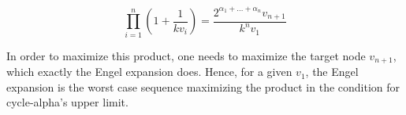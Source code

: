 \[
\prod_{i=1}^{n}\left(1+\frac{1}{kv_i}\right)=\frac{2^{\alpha_1+\ldots+\alpha_n}v_{n+1}}{k^nv_1}
\]

In order to maximize this product, one needs to maximize the target node $v_{n+1}$, which exactly the Engel expansion does. Hence, for a given $v_1$, the Engel expansion is the worst case sequence maximizing the product in the condition for cycle-alpha's upper limit.
